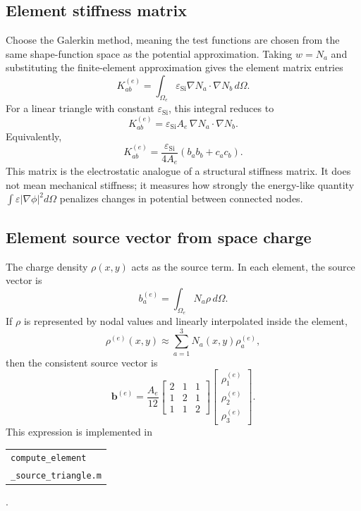 \documentclass[11pt]{article}
\begin{document}
\subsection{Element stiffness matrix}

Choose the Galerkin method, meaning the test functions are chosen from the same shape-function space as the potential approximation. Taking $w=N_a$ and substituting the finite-element approximation gives the element matrix entries
\begin{equation}
K_{ab}^{(e)} = \int_{\Omega_e} \varepsilon_{\mathrm{Si}} \nabla N_a \cdot \nabla N_b \, d\Omega.
\end{equation}
For a linear triangle with constant $\varepsilon_{\mathrm{Si}}$, this integral reduces to
\begin{equation}
K_{ab}^{(e)}
= \varepsilon_{\mathrm{Si}} A_e \, \nabla N_a \cdot \nabla N_b.
\end{equation}
Equivalently,
\begin{equation}
K_{ab}^{(e)}
= \frac{\varepsilon_{\mathrm{Si}}}{4A_e}\left(b_a b_b + c_a c_b\right).
\end{equation}
This matrix is the electrostatic analogue of a structural stiffness matrix. It does not mean mechanical stiffness; it measures how strongly the energy-like quantity $\int \varepsilon |\nabla \phi|^2 d\Omega$ penalizes changes in potential between connected nodes.

\subsection{Element source vector from space charge}

The charge density $\rho(x,y)$ acts as the source term. In each element, the source vector is
\begin{equation}
b_a^{(e)} = \int_{\Omega_e} N_a \rho \, d\Omega.
\end{equation}
If $\rho$ is represented by nodal values and linearly interpolated inside the element,
\begin{equation}
\rho^{(e)}(x,y) \approx \sum_{a=1}^{3} N_a(x,y) \rho_a^{(e)},
\end{equation}
then the consistent source vector is
\begin{equation}
\bm{b}^{(e)}
= \frac{A_e}{12}
\begin{bmatrix}
2 & 1 & 1 \\
1 & 2 & 1 \\
1 & 1 & 2
\end{bmatrix}
\begin{bmatrix}
\rho_1^{(e)} \\
\rho_2^{(e)} \\
\rho_3^{(e)}
\end{bmatrix}.
\end{equation}
This expression is implemented in \begin{tabular}[t]{@{}l@{}}\texttt{compute\_element}\\\texttt{\_source\_triangle.m}\end{tabular}.
\end{document}
